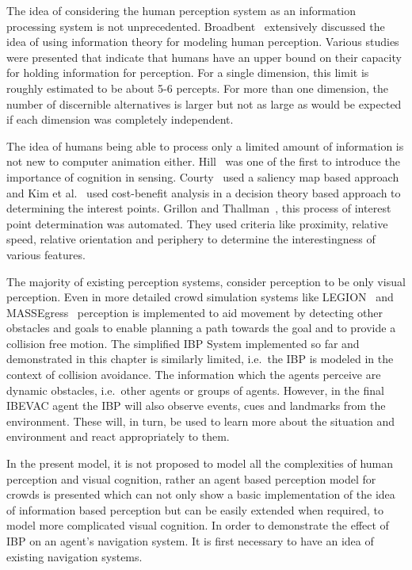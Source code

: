 The idea of considering the human perception system as an information processing system is not unprecedented. Broadbent~\cite{Broadbent:1965is} extensively discussed the idea of using information theory for modeling human perception. Various studies were presented that indicate that humans have an upper bound on their capacity for holding information for perception. For a single dimension, this limit is roughly estimated to be about 5-6 percepts. For more than one dimension, the number of discernible alternatives is larger but not as large as would be expected if each dimension was completely independent.

The idea of humans being able to process only a limited amount of information is not new to computer animation either. Hill~\cite{Hill:1999ww} was one of the first to introduce the importance of cognition in sensing. Courty~\cite{Courty:2003hy} used a saliency map based approach and Kim et al.~\cite{Kim:2005ub} used cost-benefit analysis in a decision theory based approach to determining the interest points. Grillon and Thallman~\cite{Grillon:2009hf}, this process of interest point determination was automated. They used criteria like proximity, relative speed, relative orientation and periphery to determine the interestingness of various features.

The majority of existing perception systems, consider perception to be only visual perception. Even in more detailed crowd simulation systems like LEGION~\cite{Still:2000tp} and MASSEgress~\cite{Pan:2006vp} perception is implemented to aid movement by detecting other obstacles and goals to enable planning a path towards the goal and to provide a collision free motion. The simplified IBP System implemented so far and demonstrated in this chapter is similarly limited, i.e.\ the IBP is modeled in the context of collision avoidance. The information which the agents perceive are dynamic obstacles, i.e.\ other agents or groups of agents. However, in the final IBEVAC agent the IBP will also observe events, cues and landmarks from the environment. These will, in turn, be used to learn more about the situation and environment and react appropriately to them.

In the present model, it is not proposed to model all the complexities of human perception and visual cognition, rather an agent based perception model for crowds is presented which can not only show a basic implementation of the idea of information based perception but can be easily extended when required, to model more complicated visual cognition. In order to demonstrate the effect of IBP on an agent's navigation system. It is first necessary to have an idea of existing navigation systems.


